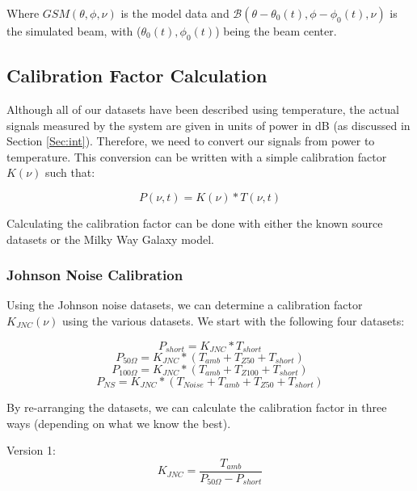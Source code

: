 Where $GSM (\theta, \phi, \nu)$ is the model data and $\mathcal{B} (\theta - \theta_0(t), \phi - \phi_0(t),\nu)$ is the simulated beam, with ($\theta_0 (t),\phi_0 (t)$) being the beam center. 

\subsection{Calibration Factor Calculation}

Although all of our datasets have been described using temperature, the actual signals measured by the system are given in units of power in dB (as discussed in Section \ref{Sec:int}). Therefore, we need to convert our signals from power to temperature. This conversion can be written with a simple calibration factor $K(\nu)$ such that:

\begin{equation}
P(\nu,t) = K(\nu)*T(\nu,t)
\end{equation}

Calculating the calibration factor can be done with either the known source datasets or the Milky Way Galaxy model. 

\subsubsection{Johnson Noise Calibration}

Using the Johnson noise datasets, we can determine a calibration factor $K_{JNC}(\nu)$ using the various datasets. We start with the following four datasets:

\begin{equation}
P_{short} = K_{JNC}*T_{short}
\end{equation}
\begin{equation}
P_{50 \Omega} = K_{JNC}*(T_{amb} + T_{Z50} + T_{short})
\end{equation}
\begin{equation}
P_{100 \Omega} = K_{JNC}*(T_{amb} + T_{Z100}+T_{short})
\end{equation}
\begin{equation}
P_{NS} = K_{JNC}*(T_{Noise}+T_{amb}+T_{Z50}+T_{short})
\end{equation}

By re-arranging the datasets, we can calculate the calibration factor in three ways (depending on what we know the best). 

Version 1:
\begin{equation}
K_{JNC} = \frac{T_{amb}}{P_{50 \Omega} - P_{short}}
\end{equation}

